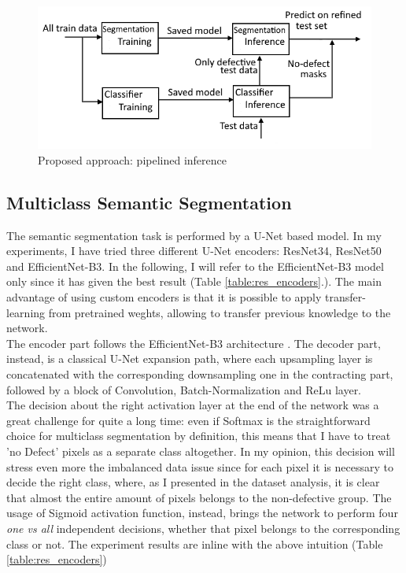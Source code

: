 \documentclass[10pt,twocolumn,letterpaper]{article}
\begin{document}
   \begin{figure}[h]
      \caption{Proposed approach: pipelined inference } \label{fig:secondApproach}
      \includegraphics[scale=0.48]{Img_SecondApproach}
   \end{figure}


   \subsection{Multiclass Semantic Segmentation}
   The semantic segmentation task is performed by a U-Net based model. In my experiments, I have tried three different U-Net encoders: ResNet34, ResNet50 and EfficientNet-B3. In the following, I will refer to the EfficientNet-B3 model only since it has given the best result (Table \ref{table:res_encoders}.).
   The main advantage of using custom encoders is that it is possible to apply transfer-learning from pretrained weghts, allowing to transfer previous knowledge to the network. \\
   The encoder part follows the EfficientNet-B3 architecture \cite{efficientnet}. The decoder part, instead, is a classical U-Net expansion path, where each upsampling layer is concatenated with the corresponding downsampling one in the contracting part, followed by a block of Convolution, Batch-Normalization and ReLu layer. \\
   The decision about the right activation layer at the end of the network was a great challenge for quite a long time: even if Softmax is the straightforward choice for multiclass segmentation by definition, this means that I have to treat 'no Defect' pixels as a separate class altogether. In my opinion, this decision will stress even more the imbalanced data issue since for each pixel it is necessary to decide the right class, where, as I presented in the dataset analysis, it is clear that almost the entire amount of pixels belongs to the non-defective group. The usage of Sigmoid activation function, instead, brings the network to perform four \textit{one vs all} independent decisions, whether that pixel belongs to the corresponding class or not. The experiment results are inline with the above intuition (Table \ref{table:res_encoders})
\end{document}
